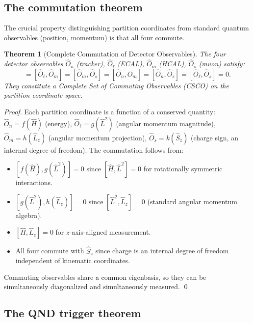 \documentclass[twocolumn,10pt,a4paper]{article}
\theoremstyle{thmstyle}
\newtheorem{theorem}{Theorem}[section]
\theoremstyle{definition}
\theoremstyle{remark}
\begin{document}
\subsection{The commutation theorem}

The crucial property distinguishing partition coordinates from standard
quantum observables (position, momentum) is that all four commute.

\begin{theorem}[Complete Commutation of Detector Observables]
\label{thm:commutation}
The four detector observables $\hat{O}_n$ (tracker), $\hat{O}_\ell$ (ECAL),
$\hat{O}_m$ (HCAL), $\hat{O}_s$ (muon) satisfy:
\begin{equation}
[\hat{O}_n, \hat{O}_\ell] = [\hat{O}_\ell, \hat{O}_m] = [\hat{O}_m, \hat{O}_s]
= [\hat{O}_n, \hat{O}_m] = [\hat{O}_n, \hat{O}_s] = [\hat{O}_\ell, \hat{O}_s] = 0.
\label{eq:commutation}
\end{equation}
They constitute a Complete Set of Commuting Observables (CSCO) on the
partition coordinate space.
\end{theorem}

\begin{proof}
Each partition coordinate is a function of a conserved quantity:
$\hat{O}_n = f(\hat{H})$ (energy), $\hat{O}_\ell = g(\hat{L}^2)$
(angular momentum magnitude), $\hat{O}_m = h(\hat{L}_z)$
(angular momentum projection), $\hat{O}_s = k(\hat{S}_z)$ (charge sign,
an internal degree of freedom). The commutation follows from:
\begin{itemize}[nosep]
\item $[f(\hat{H}), g(\hat{L}^2)] = 0$ since $[\hat{H}, \hat{L}^2] = 0$
for rotationally symmetric interactions.
\item $[g(\hat{L}^2), h(\hat{L}_z)] = 0$ since $[\hat{L}^2, \hat{L}_z] = 0$
(standard angular momentum algebra).
\item $[\hat{H}, \hat{L}_z] = 0$ for $z$-axis-aligned measurement.
\item All four commute with $\hat{S}_z$ since charge is an internal degree
of freedom independent of kinematic coordinates.
\end{itemize}
Commuting observables share a common eigenbasis, so they can be simultaneously
diagonalized and simultaneously measured. \qed
\end{proof}

\subsection{The QND trigger theorem}
\end{document}
